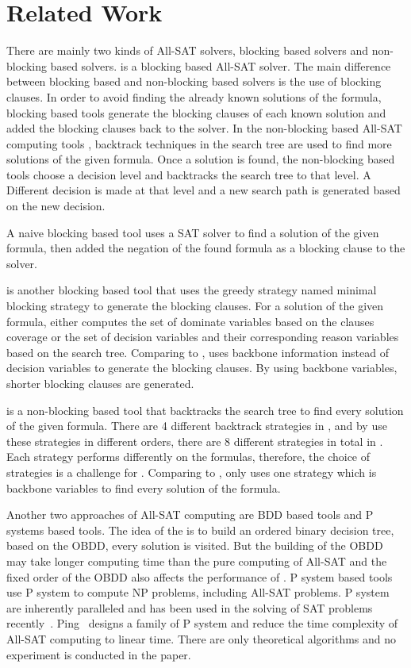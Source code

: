 \section{Related Work} \label{sec:rela}
There are mainly two kinds of All-SAT solvers, blocking based solvers and non-blocking based solvers.
\tool is a blocking based All-SAT solver.
The main difference between blocking based and non-blocking based solvers is the use of blocking clauses.
In order to avoid finding the already known solutions of the formula, blocking based tools generate the blocking clauses of each known solution and added the blocking clauses back to the solver.
In the non-blocking based All-SAT computing tools \cite{zhao2009asig} \cite{grumberg2004memory} \cite{jabbour2014extending} \cite{ietool}, backtrack techniques in the search tree are used to find more solutions of the given formula. Once a solution is found, the non-blocking based tools choose a decision level and backtracks the search tree to that level. A Different decision is made at that level and a new search path is generated based on the new decision.

A naive blocking based tool \cite{mcmillan2002applying} uses a SAT solver to find a solution of the given formula, then added the negation of the found formula as a blocking clause to the solver.

\ctool\cite{ietool} is another blocking based tool that uses the greedy strategy named minimal blocking strategy to generate the blocking clauses.
For a solution of the given formula, \ctool either computes the set of dominate variables based on the clauses coverage or the set of decision variables and their corresponding reason variables based on the search tree.
Comparing to \ctool, \tool uses backbone information instead of decision variables to generate the blocking clauses. By using backbone variables, shorter blocking clauses are generated.

\nbc\cite{ietool} is a non-blocking based tool that backtracks the search tree to find every solution of the given formula. There are 4 different backtrack strategies in \nbc, and by use these strategies in different orders, there are 8 different strategies in total in \nbc. Each strategy performs differently on the formulas, therefore, the choice of strategies is a challenge for \nbc. 
Comparing to \nbc, \tool only uses one strategy which is backbone variables to find every solution of the formula.

Another two approaches of All-SAT computing are BDD based tools and P systems based tools. The idea of the \bdd is to build an ordered binary decision tree, based on the OBDD, every solution is visited. But the building of the OBDD may take longer computing time than the pure computing of All-SAT and the fixed order of the OBDD also affects the performance of \bdd.
P system based tools use P system to compute NP problems, including All-SAT problems. P system are inherently paralleled and has been used in the solving of SAT problems recently~\cite{p}. Ping~\cite{pa} designs a family of P system and reduce the time complexity of All-SAT computing to linear time. There are only theoretical algorithms and no experiment is conducted in the paper.


